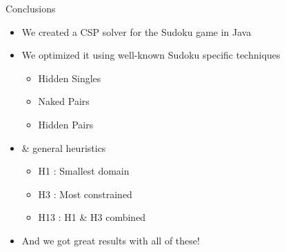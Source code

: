 \documentclass{beamer}
\begin{document}
\begin{frame}{Conclusions}
\begin{itemize}
\item We created a CSP solver for the Sudoku game in Java
\item We optimized it using well-known Sudoku specific techniques
\begin{itemize}
    \item Hidden Singles
    \item Naked Pairs
    \item Hidden Pairs
\end{itemize}
\item \& general heuristics
\begin{itemize}
    \item H1 : Smallest domain
    \item H3 : Most constrained
    \item H13 : H1 \& H3 combined
\end{itemize}
\item And we got great results with all of these!
\end{itemize}
 
\end{frame}
\end{document}
